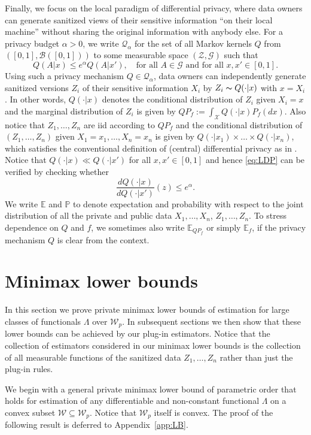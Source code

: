 \documentclass[preprint]{imsart}
\newcommand{\E}{{\mathbb E}}
\newcommand{\X}{\mathcal X}
\numberwithin{equation}{section}
\newcounter{cond}
\begin{document}
Finally, we focus on the local paradigm of differential privacy, where data owners can generate sanitized views of their sensitive information ``on their local machine'' without sharing the original information with anybody else. For a privacy budget $\alpha>0$, we write $\mathcal Q_\alpha$ for the set of all Markov kernels $Q$ from $([0,1],\mathcal B([0,1]))$ to some measurable space $(\mathcal Z, \mathcal G)$ such that 
\begin{equation}\label{eq:LDP}
Q(A|x)\le e^\alpha Q(A|x'), \quad \text{for all } A\in\mathcal G \text{ and for all } x,x'\in[0,1].
\end{equation} 
Using such a privacy mechanism $Q\in\mathcal Q_\alpha$, data owners can independently generate sanitized versions $Z_i$ of their sensitive information $X_i$ by $Z_i\thicksim Q(\cdot|x)$ with $x=X_i$. In other words, $Q(\cdot|x)$ denotes the conditional distribution of $Z_i$ given $X_i=x$ and the marginal distribution of $Z_i$ is given by $QP_f := \int_\X Q(\cdot|x) P_f(dx)$. Also notice that $Z_1,\dots, Z_n$ are iid according to $QP_f$ and the conditional distribution of $(Z_1,\dots, Z_n)$ given $X_1=x_1, \dots, X_n=x_n$ is given by $Q(\cdot|x_1)\times\dots\times Q(\cdot|x_n)$, which satisfies the conventional definition of (central) differential privacy as in \citet{Dwork06}. Notice that $Q(\cdot|x)\ll Q(\cdot|x')$ for all $x,x'\in[0,1]$ and hence \eqref{eq:LDP} can be verified by checking whether
$$
\frac{dQ(\cdot|x)}{dQ(\cdot|x')}(z) \le e^\alpha.
$$
We write $\E$ and $\mathbb{P}$ to denote expectation and probability with respect to the joint distribution of all the private and public data $X_1,\dots, X_n$, $Z_1,\dots, Z_n$. To stress dependence on $Q$ and $f$, we sometimes also write $\E_{QP_f}$ or simply $\E_f$, if the privacy mechanism $Q$ is clear from the context.


\section{Minimax lower bounds}
\label{sec:LowerBounds}
In this section we prove private minimax lower bounds of estimation for large classes of functionals $\Lambda$ over $\mathcal W_p$. In subsequent sections we then show that these lower bounds can be achieved by our plug-in estimators. Notice that the collection of estimators considered in our minimax lower bounds is the collection of all measurable functions of the sanitized data $Z_1,\dots, Z_n$ rather than just the plug-in rules. 

We begin with a general private minimax lower bound of parametric order that holds for estimation of any differentiable and non-constant functional $\Lambda$ on a convex subset $\mathcal W\subseteq\mathcal W_p$. Notice that $\mathcal W_p$ itself is convex. The proof of the following result is deferred to Appendix~\ref{app:LB}.
\end{document}
